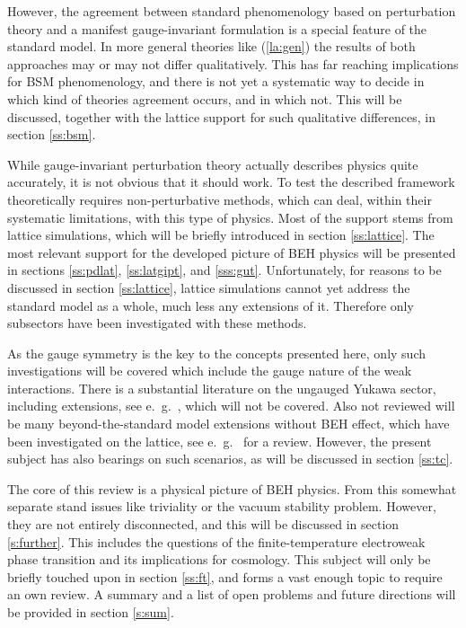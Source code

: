 \documentclass[final,12pt]{article}
\newcommand*{\pref}[1]{(\ref{#1})}
\newcommand*{\1}{1\!\!\!\bot}
\begin{document}
However, the agreement between standard phenomenology based on perturbation theory and a manifest gauge-invariant formulation is a special feature of the standard model. In more general theories like \pref{la:gen} the results of both approaches may or may not differ qualitatively. This has far reaching implications for BSM phenomenology, and there is not yet a systematic way to decide in which kind of theories agreement occurs, and in which not. This will be discussed, together with the lattice support for such qualitative differences, in section \ref{ss:bsm}.

While gauge-invariant perturbation theory actually describes physics quite accurately, it is not obvious that it should work. To test the described framework theoretically requires non-perturbative methods, which can deal, within their systematic limitations, with this type of physics. Most of the support stems from lattice simulations, which will be briefly introduced in section \ref{ss:lattice}. The most relevant support for the developed picture of BEH physics will be presented in sections \ref{ss:pdlat}, \ref{ss:latgipt}, and \ref{sss:gut}. Unfortunately, for reasons to be discussed in section \ref{ss:lattice}, lattice simulations cannot yet address the standard model as a whole, much less any extensions of it. Therefore only subsectors have been investigated with these methods.

As the gauge symmetry is the key to the concepts presented here, only such investigations will be covered which include the gauge nature of the weak interactions. There is a substantial literature on the ungauged Yukawa sector, including extensions, see e.\ g.\ \cite{Fodor:2007fn,Gerhold:2007gx,Gerhold:2010bh,Gerhold:2011mx,Chu:2015nha,Bulava:2012rb,Gies:2014xha,Capitani:2019syo}, which will not be covered. Also not reviewed will be many beyond-the-standard model extensions without BEH effect, which have been investigated on the lattice, see e.\ g.\ \cite{DeGrand:2015zxa} for a review. However, the present subject has also bearings on such scenarios, as will be discussed in section \ref{ss:tc}.

The core of this review is a physical picture of BEH physics. From this somewhat separate stand issues like triviality or the vacuum stability problem. However, they are not entirely disconnected, and this will be discussed in section \ref{s:further}. This includes the questions of the finite-temperature electroweak phase transition and its implications for cosmology. This subject will only be briefly touched upon in section \ref{ss:ft}, and forms a vast enough topic to require an own review. A summary and a list of open problems and future directions will be provided in section \ref{s:sum}.
\end{document}

